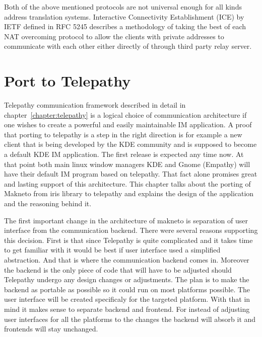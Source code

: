 Both of the above mentioned protocols are not universal enough for all kinds address translation systems. Interactive Connectivity Establishment (ICE) by IETF defined in RFC 5245 describes a methodology of taking the best of each NAT overcoming protocol to allow the clients with private addresses to communicate with each other either directly of through third party relay server.  


\chapter{Port to Telepathy}\label{chapter:port-to-telepathy}
Telepathy communication framework described in detail in chapter~\ref{chapter:telepathy} is a logical choice of communication architecture if one wishes to create a powerful and easily maintainable IM application. A proof that porting to telepathy is a step in the right direction is for example a new client that is being developed by the KDE community and is supposed to become a default KDE IM application. The first release is expected any time now. At that point both main linux window managers KDE and Gnome (Empathy) will have their default IM program based on telepathy. That fact alone promises great and lasting support of this architecture. This chapter talks about the porting of Makneto from iris library to telepathy and explains the design of the application and the reasoning behind it.

The first important change in the architecture of makneto is separation of user interface from the communication backend. There were several reasons supporting this decision. First is that since Telepathy is quite complicated and it takes time to get familiar with it would be best if user interface used a simplified abstraction. And that is where the communication backend comes in. Moreover the backend is the only piece of code that will have to be adjusted should Telepathy undergo any design changes or adjustments. The plan is to make the backend as portable as possible so it could run on most platforms possible. The user interface will be created specificaly for the targeted platform. With that in mind it makes sense to separate backend and frontend. For instead of adjusting user interfaces for all the platforms to the changes the backend will absorb it and frontends will stay unchanged. 

